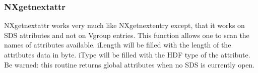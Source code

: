 \documentclass[12pt]{article}
\begin{document}
\subsubsection{NXgetnextattr}
NXgetnextattr works very much like NXgetnextentry except, that it works on
SDS attributes and not on Vgroup entries. This function allows one to scan the
names of attributes available. iLength will be filled with the length of the
attributes data in byte. iType will be filled with the HDF type of the
attribute. Be warned: this routine returns global attributes when no SDS is
currently open.

\begin{flushleft} \small
\begin{minipage}{\linewidth} \label{scrap22}
\vspace{-1ex}
\begin{list}{}{} \item
\mbox{}\verb@@\\
\mbox{}\verb@/*-------------------------------------------------------------------------*/@\\
\mbox{}\verb@  NXstatus  NXgetnextattr(NXhandle fileid, NXname pName, @\\
\mbox{}\verb@                          int *iLength, int *iType)@\\
\mbox{}\verb@  {@\\
\mbox{}\verb@     pNexusFile pFile;@\\
\mbox{}\verb@     int iRet;@\\
\mbox{}\verb@     int32 iPType, iCount;@\\
\mbox{}\verb@@\\
\mbox{}\verb@     pFile = NXIassert(fileid);@\\
\mbox{}\verb@@\\
\mbox{}\verb@     /* first check if we have to start a new attribute search */@\\
\mbox{}\verb@     if(pFile->iNDir == 0) @\\
\mbox{}\verb@     {@\\
\mbox{}\verb@        iRet = NXIInitAttDir(pFile);@\\
\mbox{}\verb@        if(iRet == NX_ERROR)@\\
\mbox{}\verb@        {@\\
\mbox{}\verb@           return NX_ERROR;@\\
\mbox{}\verb@        }@\\
\mbox{}\verb@     }@\\
\mbox{}\verb@     @\\

\end{list}
\end{minipage}
\end{flushleft}
\end{document}
